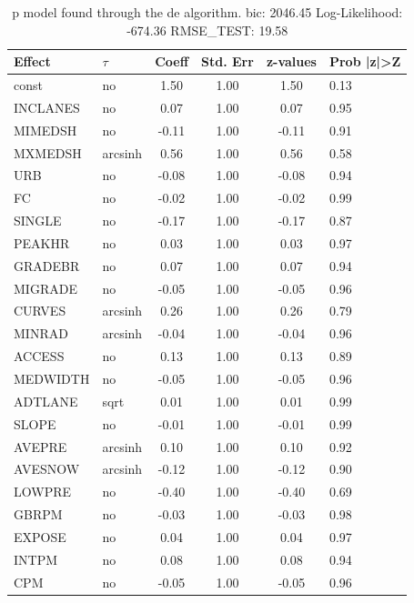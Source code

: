 \begin{table}
	\caption{p model found through the de algorithm. bic: 2046.45 Log-Likelihood: -674.36 RMSE_TEST: 19.58}
	\begin{center}
		\begin{tabular}{|l|l|c|c|c|l|}
			\hline
			Effect & $\tau$ & Coeff & Std. Err & z-values & Prob |z|>Z \\
			\hline
			const & no & 1.50 & 1.00 & 1.50 & 0.13 \\
			\hline
			INCLANES & no & 0.07 & 1.00 & 0.07 & 0.95 \\
			\hline
			MIMEDSH & no & -0.11 & 1.00 & -0.11 & 0.91 \\
			\hline
			MXMEDSH & arcsinh & 0.56 & 1.00 & 0.56 & 0.58 \\
			\hline
			URB & no & -0.08 & 1.00 & -0.08 & 0.94 \\
			\hline
			FC & no & -0.02 & 1.00 & -0.02 & 0.99 \\
			\hline
			SINGLE & no & -0.17 & 1.00 & -0.17 & 0.87 \\
			\hline
			PEAKHR & no & 0.03 & 1.00 & 0.03 & 0.97 \\
			\hline
			GRADEBR & no & 0.07 & 1.00 & 0.07 & 0.94 \\
			\hline
			MIGRADE & no & -0.05 & 1.00 & -0.05 & 0.96 \\
			\hline
			CURVES & arcsinh & 0.26 & 1.00 & 0.26 & 0.79 \\
			\hline
			MINRAD & arcsinh & -0.04 & 1.00 & -0.04 & 0.96 \\
			\hline
			ACCESS & no & 0.13 & 1.00 & 0.13 & 0.89 \\
			\hline
			MEDWIDTH & no & -0.05 & 1.00 & -0.05 & 0.96 \\
			\hline
			ADTLANE & sqrt & 0.01 & 1.00 & 0.01 & 0.99 \\
			\hline
			SLOPE & no & -0.01 & 1.00 & -0.01 & 0.99 \\
			\hline
			AVEPRE & arcsinh & 0.10 & 1.00 & 0.10 & 0.92 \\
			\hline
			AVESNOW & arcsinh & -0.12 & 1.00 & -0.12 & 0.90 \\
			\hline
			LOWPRE & no & -0.40 & 1.00 & -0.40 & 0.69 \\
			\hline
			GBRPM & no & -0.03 & 1.00 & -0.03 & 0.98 \\
			\hline
			EXPOSE & no & 0.04 & 1.00 & 0.04 & 0.97 \\
			\hline
			INTPM & no & 0.08 & 1.00 & 0.08 & 0.94 \\
			\hline
			CPM & no & -0.05 & 1.00 & -0.05 & 0.96 \\

\end{tabular}
\end{center}
\end{table}
